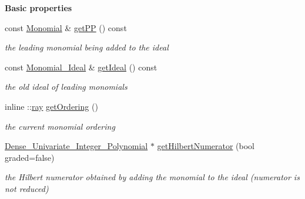 \begin{Indent}\textbf{ Basic properties}\par
\begin{DoxyCompactItemize}
\item 
\mbox{\label{class_p_p_with_ideal_a89093fdbc58161c646f61b54b0cd3ed5}} 
const \hyperlink{class_monomial}{Monomial} \& \hyperlink{class_p_p_with_ideal_a89093fdbc58161c646f61b54b0cd3ed5}{get\+PP} () const
\begin{DoxyCompactList}\small\item\em the leading monomial being added to the ideal \end{DoxyCompactList}\item 
\mbox{\label{class_p_p_with_ideal_ad83d8400ef6e5c9fc5e100b304063500}} 
const \hyperlink{class_monomial___ideal}{Monomial\+\_\+\+Ideal} \& \hyperlink{class_p_p_with_ideal_ad83d8400ef6e5c9fc5e100b304063500}{get\+Ideal} () const
\begin{DoxyCompactList}\small\item\em the old ideal of leading monomials \end{DoxyCompactList}\item 
\mbox{\label{class_p_p_with_ideal_a11af0cf4088749e2edf36ddd98ec5dc0}} 
inline \+::\hyperlink{classray}{ray} \hyperlink{class_p_p_with_ideal_a11af0cf4088749e2edf36ddd98ec5dc0}{get\+Ordering} ()
\begin{DoxyCompactList}\small\item\em the current monomial ordering \end{DoxyCompactList}\item 
\mbox{\label{class_p_p_with_ideal_a26a40483e6f79118a5433ef255f77bb1}} 
\hyperlink{class_dense___univariate___integer___polynomial}{Dense\+\_\+\+Univariate\+\_\+\+Integer\+\_\+\+Polynomial} $\ast$ \hyperlink{class_p_p_with_ideal_a26a40483e6f79118a5433ef255f77bb1}{get\+Hilbert\+Numerator} (bool graded=false)
\begin{DoxyCompactList}\small\item\em the Hilbert numerator obtained by adding the monomial to the ideal (numerator is {\itshape not} reduced) \end{DoxyCompactList}\item 
\mbox{\label{class_p_p_with_ideal_ad703f1e2a2ee6f4f5862146f52d8b4e4}} 

\end{DoxyCompactItemize}
\end{Indent}
